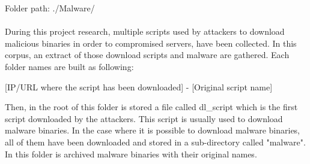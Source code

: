 
Folder path: ./Malware/

\paragraph{}    
During this project research, multiple scripts used by attackers to download malicious
binaries in order to compromised servers, have been collected. In this corpus, an extract
of those download scripts and malware are gathered.
Each folder names are built as following:
\begin{center}
[IP/URL where the script has been downloaded] - [Original script name]
\end{center}
Then, in the root of this folder is stored a file called dl\_script which is the first
script downloaded by the attackers. This script is usually used to download malware binaries.
In the case where it is possible to download malware binaries, all of them have been downloaded
and stored in a sub-directory called "malware". In this folder is archived malware binaries 
with their original names.
